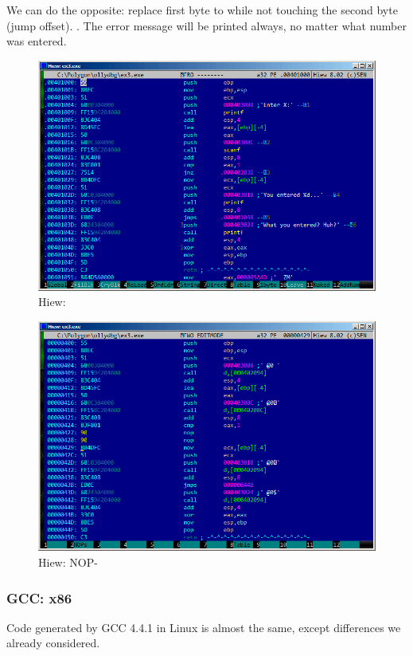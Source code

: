 {We can do the opposite: replace first byte to  while not touching the second byte (jump offset)}.
.
{The error message will be printed always, no matter what number was entered}.

\begin{figure}[H]
\centering
\includegraphics[scale=0.66]{patterns/04_scanf/ex3_hiew_1.png}
\caption{Hiew: \main{}}
\label{fig:scanf_ex3_hiew_1}
\end{figure}

\begin{figure}[H]
\centering
\includegraphics[scale=0.66]{patterns/04_scanf/ex3_hiew_2.png}
\caption{Hiew:    \ac{NOP}-}
\label{fig:scanf_ex3_hiew_2}
\end{figure}

\subsubsection{GCC: x86}

{Code generated by GCC 4.4.1 in Linux is almost the same, except differences we already considered.}
